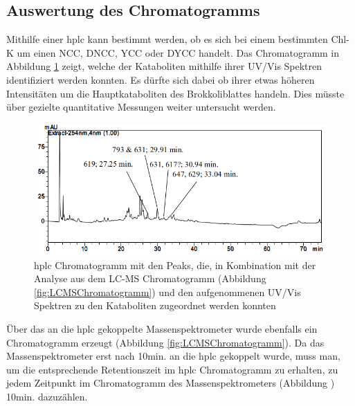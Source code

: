 \subsection{Auswertung des Chromatogramms}

Mithilfe einer \gls{hplc} kann bestimmt werden, ob es sich bei einem bestimmten \gls{Chl-K} um einen NCC, DNCC, YCC oder DYCC handelt. Das Chromatogramm in Abbildung \ref{fig:HPLCChromatogramm} zeigt, welche der Kataboliten mithilfe ihrer UV/Vis Spektren identifiziert werden konnten. Es dürfte sich dabei ob ihrer etwas höheren Intensitäten um die Hauptkataboliten des Brokkoliblattes handeln. Dies müsste über gezielte quantitative Messungen weiter untersucht werden.

\begin{figure}[!htbp]
  
  \includegraphics[width=\textwidth]{figures/Kapitel6/keineReaktion/VWA_HPLC_Chromatogramm_keineReaktion.png}
  \caption[HPLC Chromatogramm, Quelle: Author]{\gls{hplc} Chromatogramm mit den Peaks, die, in Kombination mit der Analyse aus dem LC-MS Chromatogramm (Abbildung \ref{fig:LCMSChromatogramm}) und den aufgenommenen UV/Vis Spektren zu den Kataboliten zugeordnet werden konnten}
  \label{fig:HPLCChromatogramm}
\end{figure}

Über das an die \gls{hplc} gekoppelte Massenspektrometer wurde ebenfalls ein Chromatogramm erzeugt (Abbildung \ref{fig:LCMSChromatogramm}). Da das Massenspektrometer erst nach 10min. an die \gls{hplc} gekoppelt wurde, muss man, um die entsprechende Retentionszeit im \gls{hplc} Chromatogramm zu erhalten, zu jedem Zeitpunkt im Chromatogramm des Massenspektrometers (Abbildung ) 10min. dazuzählen. 

